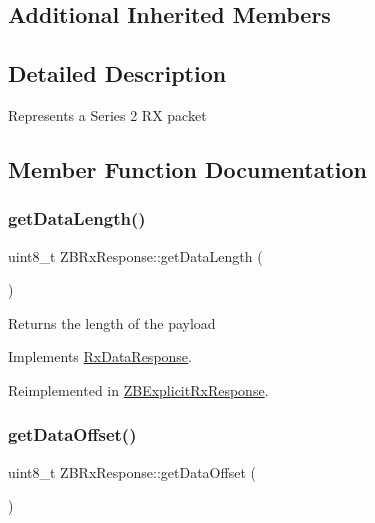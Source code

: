 \subsection*{Additional Inherited Members}


\subsection{Detailed Description}
Represents a Series 2 RX packet 

\subsection{Member Function Documentation}
\hypertarget{class_z_b_rx_response_a9d2b73060d611bbdd581e0ceb195fd31}{}\label{class_z_b_rx_response_a9d2b73060d611bbdd581e0ceb195fd31} 
\subsubsection{\texorpdfstring{get\+Data\+Length()}{getDataLength()}}
{\footnotesize\ttfamily uint8\+\_\+t Z\+B\+Rx\+Response\+::get\+Data\+Length (\begin{DoxyParamCaption}{ }\end{DoxyParamCaption})\hspace{0.3cm}{\ttfamily [virtual]}}

Returns the length of the payload 

Implements \hyperlink{class_rx_data_response_a5845e6a0719fd0bf52675e47053a704e}{Rx\+Data\+Response}.



Reimplemented in \hyperlink{class_z_b_explicit_rx_response_af0f29cd6d76215f50224547ef8201cb7}{Z\+B\+Explicit\+Rx\+Response}.

\hypertarget{class_z_b_rx_response_ad54e6ff3008f79d0ed32a78cc3d69151}{}\label{class_z_b_rx_response_ad54e6ff3008f79d0ed32a78cc3d69151} 
\subsubsection{\texorpdfstring{get\+Data\+Offset()}{getDataOffset()}}
{\footnotesize\ttfamily uint8\+\_\+t Z\+B\+Rx\+Response\+::get\+Data\+Offset (\begin{DoxyParamCaption}{ }\end{DoxyParamCaption})\hspace{0.3cm}{\ttfamily [virtual]}}

